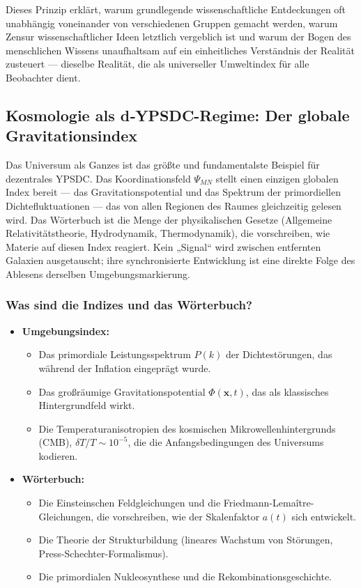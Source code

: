 \documentclass[11pt,a4paper]{article}
\begin{document}
	Dieses Prinzip erklärt, warum grundlegende wissenschaftliche Entdeckungen oft unabhängig voneinander von verschiedenen Gruppen gemacht werden, warum Zensur wissenschaftlicher Ideen letztlich vergeblich ist und warum der Bogen des menschlichen Wissens unaufhaltsam auf ein einheitliches Verständnis der Realität zusteuert — dieselbe Realität, die als universeller Umweltindex für alle Beobachter dient.
	
	\subsection{Kosmologie als d‑YPSDC-Regime: Der globale Gravitationsindex}
	\label{subsec:cosmology-dypsdc}
	
	Das Universum als Ganzes ist das größte und fundamentalste Beispiel für dezentrales YPSDC. Das Koordinationsfeld \(\Psi_{MN}\) stellt einen einzigen globalen Index bereit — das Gravitationspotential und das Spektrum der primordiellen Dichtefluktuationen — das von allen Regionen des Raumes gleichzeitig gelesen wird. Das Wörterbuch ist die Menge der physikalischen Gesetze (Allgemeine Relativitätstheorie, Hydrodynamik, Thermodynamik), die vorschreiben, wie Materie auf diesen Index reagiert. Kein „Signal“ wird zwischen entfernten Galaxien ausgetauscht; ihre synchronisierte Entwicklung ist eine direkte Folge des Ablesens derselben Umgebungsmarkierung.
	
	\subsubsection*{Was sind die Indizes und das Wörterbuch?}
	\begin{itemize}[leftmargin=*]
		\item \textbf{Umgebungsindex:}
		\begin{itemize}
			\item Das primordiale Leistungsspektrum \(P(k)\) der Dichtestörungen, das während der Inflation eingeprägt wurde.
			\item Das großräumige Gravitationspotential \(\Phi(\mathbf{x},t)\), das als klassisches Hintergrundfeld wirkt.
			\item Die Temperaturanisotropien des kosmischen Mikrowellenhintergrunds (CMB), \(\delta T / T \sim 10^{-5}\), die die Anfangsbedingungen des Universums kodieren.
		\end{itemize}
		\item \textbf{Wörterbuch:}
		\begin{itemize}
			\item Die Einsteinschen Feldgleichungen und die Friedmann-Lemaître-Gleichungen, die vorschreiben, wie der Skalenfaktor \(a(t)\) sich entwickelt.
			\item Die Theorie der Strukturbildung (lineares Wachstum von Störungen, Press-Schechter-Formalismus).
			\item Die primordialen Nukleosynthese und die Rekombinationsgeschichte.
		\end{itemize}
	\end{itemize}
	
\end{document}
